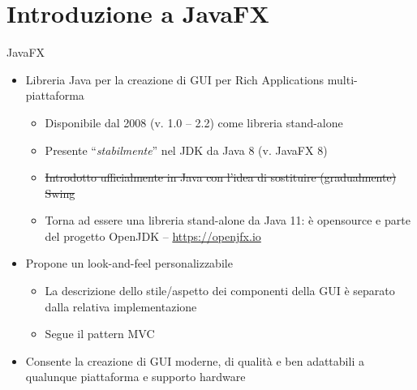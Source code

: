 \documentclass[presentation]{beamer}
\begin{document}
\section{Introduzione a JavaFX}

\begin{frame}{JavaFX}
\begin{itemize}\itemsep20pt
\item Libreria Java per la creazione di GUI per Rich Applications multi-piattaforma
\begin{itemize}
\item Disponibile dal 2008 (v. 1.0 -- 2.2) come libreria stand-alone
\item Presente ``\emph{stabilmente}'' nel JDK da Java 8 (v. JavaFX 8)
\item \st{Introdotto ufficialmente in Java con l'idea di sostituire (gradualmente) Swing}
\item Torna ad essere una libreria stand-alone da Java 11:
 è opensource e parte del progetto OpenJDK -- \url{https://openjfx.io}
\end{itemize}
\item Propone un look-and-feel personalizzabile
\begin{itemize}
\item La descrizione dello stile/aspetto dei componenti della GUI è separato dalla relativa implementazione
\item Segue il pattern MVC
\end{itemize}
\item Consente la creazione di GUI moderne, di qualità e ben adattabili a qualunque piattaforma e supporto hardware
\end{itemize}
\end{frame}
\end{document}
